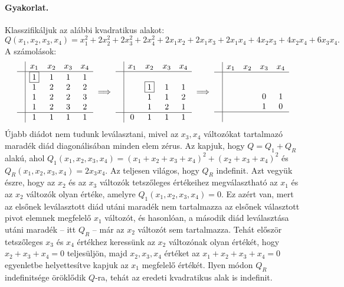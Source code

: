 \documentclass[a4paper, showtrims]{memoir}
\theoremstyle{plain}
\theoremstyle{remark}
\theoremstyle{definition}
\begin{document}
\paragraph{Gyakorlat.}
Klasszifikáljuk az alábbi kvadratikus alakot:
\[
    Q\left( x_1,x_2,x_3,x_4 \right)
    =
    x_1^2+2x_2^2+2x_3^2+2x_4^2+
    2x_1x_2+2x_1x_3+2x_1x_4+
    4x_2x_3+4x_2x_4+
    6x_3x_4.
\]
A számolások:
\[
\begin{array}{c|cccc}
     & x_1       & x_2 & x_3 & x_4\\
     \hline
     & \boxed{1} & 1   & 1 &1  \\
     & 1         & 2   & 2 &2   \\
     & 1         & 2   & 2 &3  \\
     & 1         & 2   & 3 &2  \\
    \hline
    & 1     & 1   & 1 & 1
\end{array}
\implies
\begin{array}{c|cccc}
     & x_1& x_2  & x_3 &x_4 \\
     \hline
     & &                &  &   \\
     & & \boxed{1}      & 1 &1   \\
     & & 1              & 1 &2   \\
     & & 1              & 2 &1   \\
     \hline
     &0 & 1         & 1 & 1
\end{array}
\implies
\begin{array}{c|cccc}
     & x_1 & x_2 & x_3 & x_4      \\
     \hline
     &     &     &     &      \\
     &     &     &     &      \\
     &     &     &  0  & 1 \\
     &     &     &  1  & 0 \\
    \hline
     &     &     &     &
\end{array}
\]
Újabb diádot nem tudunk leválasztani, mivel az $x_3,x_4$ változókat tartalmazó maradék diád
diagonálisában minden elem zérus.
Az kapjuk, hogy $Q=Q_1+Q_R$ alakú, ahol 
$Q_1\left( x_1,x_2,x_3,x_4 \right)
=
\left( x_1+x_2+x_3+x_4 \right)^2+
\left( x_2+x_3+x_4 \right)^2
$
és $Q_R\left( x_1,x_2,x_3,x_4 \right)=2x_3x_4$.
Az teljesen világos, hogy $Q_R$ indefinit.
Azt vegyük észre, hogy az $x_2$ és az $x_3$ változók tetszőleges értékeihez megválasztható az 
$x_1$ és az $x_2$
változók olyan értéke, 
amelyre $Q_1\left( x_1,x_2,x_3,x_4 \right)=0$.
Ez azért van, mert az elsőnek leválasztott diád utáni maradék nem tartalmazza az elsőnek választott pivot elemnek
megfelelő $x_1$ változót, 
és hasonlóan, 
a második diád leválasztása utáni maradék -- itt $Q_R$ -- már az $x_2$ változót sem tartalmazza.
Tehát először tetszőleges $x_3$ és $x_4$ értékhez keressünk az $x_2$ változónak olyan értékét, 
hogy $x_2+x_3+x_4=0$ teljesüljön,
majd $x_2,x_3,x_4$ értéket az $x_1+x_2+x_3+x_4=0$ egyenletbe helyettesítve kapjuk az $x_1$ megfelelő értékét.
Ilyen módon $Q_R$ indefinitsége öröklődik $Q$-ra, 
tehát az eredeti kvadratikus alak is indefinit.
\end{document}
